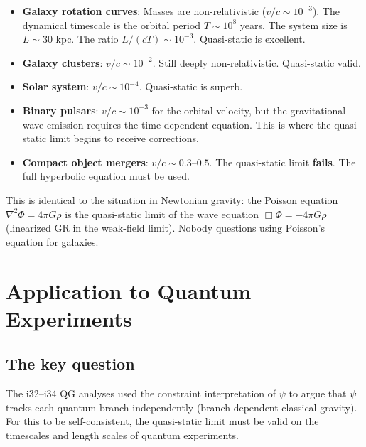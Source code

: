 \documentclass[12pt,a4paper]{article}
\begin{document}
\begin{itemize}
\item \textbf{Galaxy rotation curves}: Masses are non-relativistic ($v/c \sim 10^{-3}$). The dynamical timescale is the orbital period $T \sim 10^8$ years. The system size is $L \sim 30$ kpc. The ratio $L/(cT) \sim 10^{-3}$. Quasi-static is excellent.

\item \textbf{Galaxy clusters}: $v/c \sim 10^{-2}$. Still deeply non-relativistic. Quasi-static valid.

\item \textbf{Solar system}: $v/c \sim 10^{-4}$. Quasi-static is superb.

\item \textbf{Binary pulsars}: $v/c \sim 10^{-3}$ for the orbital velocity, but the gravitational wave emission requires the time-dependent equation. This is where the quasi-static limit begins to receive corrections.

\item \textbf{Compact object mergers}: $v/c \sim 0.3$--$0.5$. The quasi-static limit \textbf{fails}. The full hyperbolic equation must be used.
\end{itemize}

This is identical to the situation in Newtonian gravity: the Poisson equation
$\nabla^2\Phi = 4\pi G\rho$ is the quasi-static limit of the wave equation
$\Box\Phi = -4\pi G\rho$ (linearized GR in the weak-field limit). Nobody
questions using Poisson's equation for galaxies.


\section{Application to Quantum Experiments}
\label{sec:quantum}

\subsection{The key question}

The i32--i34 QG analyses used the constraint interpretation of $\psi$ to
argue that $\psi$ tracks each quantum branch independently (branch-dependent
classical gravity). For this to be self-consistent, the quasi-static limit
must be valid on the timescales and length scales of quantum experiments.
\end{document}
